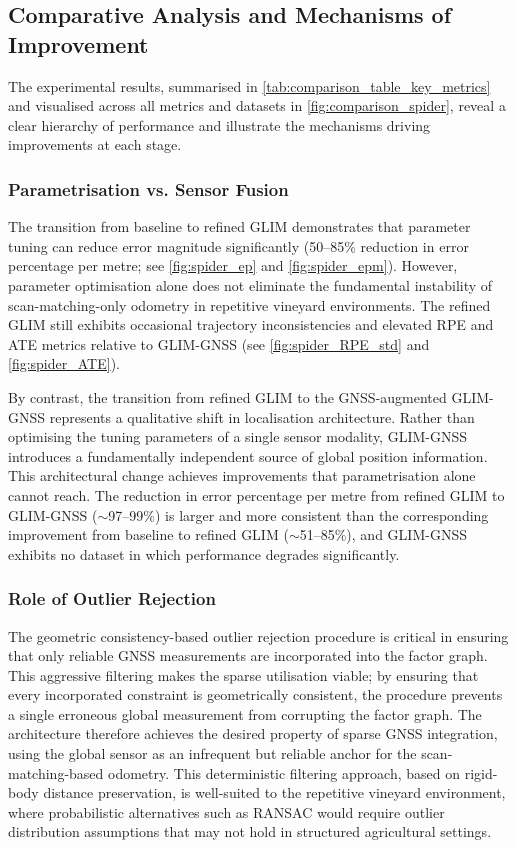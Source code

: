 \subsection{Comparative Analysis and Mechanisms of Improvement}

The experimental results, summarised in \cref{tab:comparison_table_key_metrics} and visualised across all metrics and datasets in \cref{fig:comparison_spider}, reveal a clear hierarchy of performance and illustrate the mechanisms driving improvements at each stage.

\subsubsection{Parametrisation vs. Sensor Fusion}

The transition from baseline to refined GLIM demonstrates that parameter tuning can reduce error magnitude significantly (50--85\% reduction in error percentage per metre; see \cref{fig:spider_ep} and \cref{fig:spider_epm}). However, parameter optimisation alone does not eliminate the fundamental instability of scan-matching-only odometry in repetitive vineyard environments. The refined GLIM still exhibits occasional trajectory inconsistencies and elevated RPE and ATE metrics relative to GLIM-GNSS (see \cref{fig:spider_RPE_std} and \cref{fig:spider_ATE}).

By contrast, the transition from refined GLIM to the GNSS-augmented GLIM-GNSS represents a qualitative shift in localisation architecture. Rather than optimising the tuning parameters of a single sensor modality, GLIM-GNSS introduces a fundamentally independent source of global position information. This architectural change achieves improvements that parametrisation alone cannot reach. The reduction in error percentage per metre from refined GLIM to GLIM-GNSS ($\sim$97--99\%) is larger and more consistent than the corresponding improvement from baseline to refined GLIM ($\sim$51--85\%), and GLIM-GNSS exhibits no dataset in which performance degrades significantly.

\subsubsection{Role of Outlier Rejection}

The geometric consistency-based outlier rejection procedure is critical in ensuring that only reliable GNSS measurements are incorporated into the factor graph. This aggressive filtering makes the sparse utilisation viable; by ensuring that every incorporated constraint is geometrically consistent, the procedure prevents a single erroneous global measurement from corrupting the factor graph. The architecture therefore achieves the desired property of sparse GNSS integration, using the global sensor as an infrequent but reliable anchor for the scan-matching-based odometry. This deterministic filtering approach, based on rigid-body distance preservation, is well-suited to the repetitive vineyard environment, where probabilistic alternatives such as RANSAC would require outlier distribution assumptions that may not hold in structured agricultural settings.

